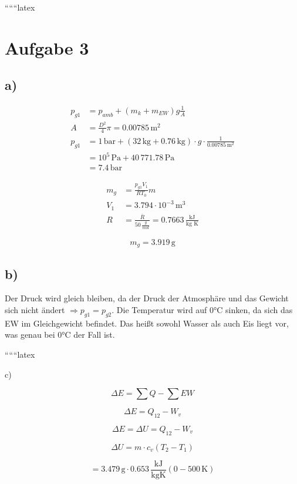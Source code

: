 
``````latex


\section*{Aufgabe 3}

\subsection*{a)}

\begin{align*}
    p_{g1} &= p_{amb} + (m_k + m_{EW}) g \frac{1}{A} \\
    A &= \frac{D^2}{4} \pi = 0.00785 \, \text{m}^2 \\
    p_{g1} &= 1 \, \text{bar} + (32 \, \text{kg} + 0.76 \, \text{kg}) \cdot g \cdot \frac{1}{0.00785 \, \text{m}^2} \\
    &= 10^5 \, \text{Pa} + 40 \, 771.78 \, \text{Pa} \\
    &= \boxed{7.4 \, \text{bar}}
\end{align*}

\begin{align*}
    m_g &= \frac{p_{g1} V_1}{R T_0} m \\
    V_1 &= 3.794 \cdot 10^{-3} \, \text{m}^3 \\
    R &= \frac{\overline{R}}{50 \, \frac{g}{mol}} = \boxed{0.7663 \, \frac{\text{kJ}}{\text{kg K}}}
\end{align*}

\[
    m_g = \boxed{3.919 \, \text{g}}
\]

\subsection*{b)}

Der Druck wird gleich bleiben, da der Druck der Atmosphäre und das Gewicht sich nicht ändert $\Rightarrow p_{g1} = p_{g2}$. Die Temperatur wird auf 0°C sinken, da sich das EW im Gleichgewicht befindet. Das heißt sowohl Wasser als auch Eis liegt vor, was genau bei 0°C der Fall ist.

``````latex


c)

\[
\Delta E = \sum Q - \sum EW
\]

\[
\Delta E = Q_{12} - W_v
\]

\[
\Delta E = \Delta U = Q_{12} - W_v
\]

\[
\Delta U = m \cdot c_v (T_2 - T_1)
\]

\[
= 3.479 \, \text{g} \cdot 0.653 \, \frac{\text{kJ}}{\text{kgK}} (0 - 500 \, \text{K})
\]


